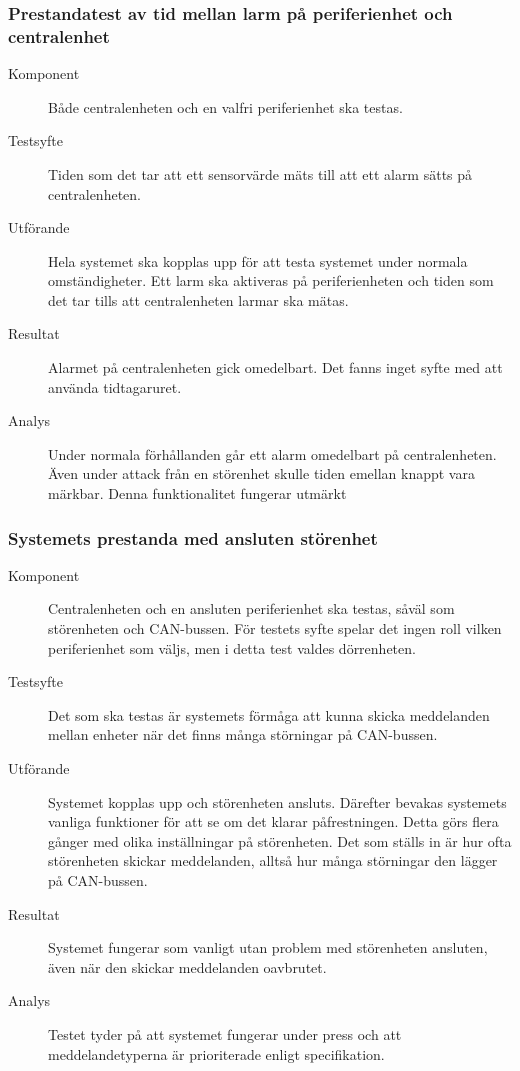 \documentclass[a4paper]{article}
\begin{document}
\subsubsection{Prestandatest av tid mellan larm på periferienhet och centralenhet}
\begin{description}
\item[Komponent] Både centralenheten och en valfri periferienhet ska testas.

\item[Testsyfte] Tiden som det tar att ett sensorvärde mäts till att ett alarm sätts på centralenheten.

\item[Utförande] Hela systemet ska kopplas upp för att testa systemet under normala omständigheter. Ett larm ska aktiveras på periferienheten och tiden som det tar tills att centralenheten larmar ska mätas.

\item[Resultat] Alarmet på centralenheten gick omedelbart. Det fanns inget syfte med att använda tidtagaruret.

\item[Analys] Under normala förhållanden går ett alarm omedelbart på centralenheten. Även under attack från en störenhet skulle tiden emellan knappt vara märkbar. Denna funktionalitet fungerar utmärkt
\end{description}

\subsubsection{Systemets prestanda med ansluten störenhet}
\label{A:störenhet}
\begin{description}
\item[Komponent] Centralenheten och en ansluten periferienhet ska testas, såväl som störenheten och CAN-bussen.
För testets syfte spelar det ingen roll vilken periferienhet som väljs, men i detta test valdes dörrenheten.

\item[Testsyfte] Det som ska testas är systemets förmåga att kunna skicka meddelanden mellan enheter när det finns många störningar på CAN-bussen.

\item[Utförande] Systemet kopplas upp och störenheten ansluts.
Därefter bevakas systemets vanliga funktioner för att se om det klarar påfrestningen.
Detta görs flera gånger med olika inställningar på störenheten.
Det som ställs in är hur ofta störenheten skickar meddelanden, alltså hur många störningar den lägger på CAN-bussen.

\item[Resultat] Systemet fungerar som vanligt utan problem med störenheten ansluten, även när den skickar meddelanden oavbrutet.

\item[Analys] Testet tyder på att systemet fungerar under press och att meddelandetyperna är prioriterade enligt specifikation.
\end{description}
\end{document}
